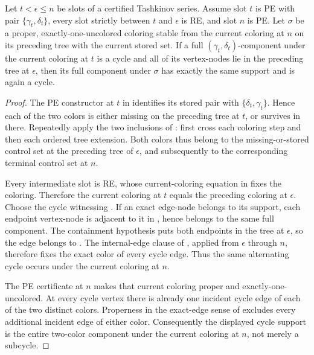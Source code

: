 \begin{helper}
Let \(t<\epsilon\le n\) be slots of a certified Tashkinov series.  Assume
slot \(t\) is PE with pair \(\{\gamma_t,\delta_t\}\), every slot strictly
between \(t\) and \(\epsilon\) is RE, and slot \(n\) is PE.  Let
\(\sigma\) be a proper, exactly-one-uncolored coloring stable from the
current coloring at \(n\) on its preceding tree with the current stored
set.  If a full \((\gamma_t,\delta_t)\)-component under the current
coloring at \(t\) is a cycle and all of its vertex-nodes lie in the
preceding tree at \(\epsilon\), then its full component under \(\sigma\)
has exactly the same support and is again a cycle.
\end{helper}
\begin{proof}
The PE constructor at \(t\) in  identifies
its stored pair with \(\{\delta_t,\gamma_t\}\).  Hence each of the two
colors is either missing on the preceding tree at \(t\), or survives in
 there.  Repeatedly apply the two
inclusions of : first cross each
coloring step and then each ordered tree extension.  Both colors thus
belong to the missing-or-stored control set at the preceding tree of
\(\epsilon\), and subsequently to the corresponding terminal control
set at \(n\).

Every intermediate slot is RE, whose current-coloring equation in
 fixes the coloring.  Therefore the current
coloring at \(t\) equals the preceding coloring at \(\epsilon\).  Choose
the cycle witnessing .  If an exact
edge-node belongs to its support, each endpoint vertex-node is adjacent
to it in , hence belongs to the same
full component.  The containment hypothesis puts both endpoints in the
tree at \(\epsilon\), so the edge belongs to .
The internal-edge clause of , applied
from \(\epsilon\) through \(n\), therefore fixes the exact color of every
cycle edge.  Thus the same alternating cycle occurs under the current
coloring at \(n\).

The PE certificate at \(n\) makes that current coloring proper and
exactly-one-uncolored.  At every cycle vertex there is already one
incident cycle edge of each of the two distinct colors.  Properness in
the exact-edge sense of  excludes every
additional incident edge of either color.  Consequently the displayed
cycle support is the entire two-color component under the current
coloring at \(n\), not merely a subcycle.


\end{proof}
